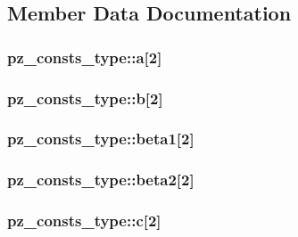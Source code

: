 \subsection{Member Data Documentation}
\hypertarget{structpz__consts__type_a420d956a3219d2e77d90f8fa12c64735}{
\subsubsection[{a}]{ pz\-\_\-consts\-\_\-type\-::a\mbox{[}2\mbox{]}}}\label{structpz__consts__type_a420d956a3219d2e77d90f8fa12c64735}
\hypertarget{structpz__consts__type_ad5f2456bb19894ea47428c830745c031}{
\subsubsection[{b}]{ pz\-\_\-consts\-\_\-type\-::b\mbox{[}2\mbox{]}}}\label{structpz__consts__type_ad5f2456bb19894ea47428c830745c031}
\hypertarget{structpz__consts__type_a6a7623fba68d04de4f9295ce77c72a5a}{
\subsubsection[{beta1}]{ pz\-\_\-consts\-\_\-type\-::beta1\mbox{[}2\mbox{]}}}\label{structpz__consts__type_a6a7623fba68d04de4f9295ce77c72a5a}
\hypertarget{structpz__consts__type_ad539aef053aa325b8a2ee145fd566c12}{
\subsubsection[{beta2}]{ pz\-\_\-consts\-\_\-type\-::beta2\mbox{[}2\mbox{]}}}\label{structpz__consts__type_ad539aef053aa325b8a2ee145fd566c12}
\hypertarget{structpz__consts__type_a5825a9be1a3dcd0b1ce88eb2c329e255}{
\subsubsection[{c}]{ pz\-\_\-consts\-\_\-type\-::c\mbox{[}2\mbox{]}}}\label{structpz__consts__type_a5825a9be1a3dcd0b1ce88eb2c329e255}
